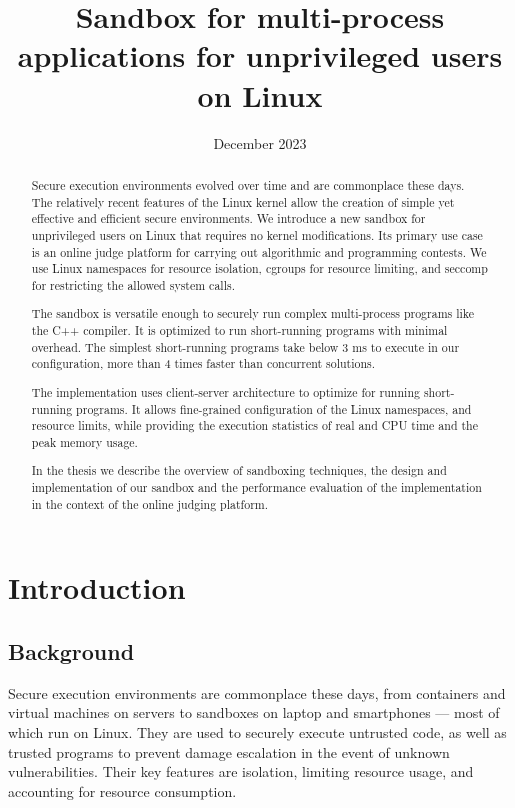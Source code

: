 \documentclass[en]{pracamgr}
\title{Sandbox for multi-process applications for unprivileged users on Linux}
\date{December 2023}
\begin{document}
\renewcommand\textfraction{0}

\maketitle

\begin{abstract}
Secure execution environments evolved over time and are commonplace these days. The relatively recent features of the Linux kernel allow the creation of simple yet effective and efficient secure environments. We introduce a new sandbox for unprivileged users on Linux that requires no kernel modifications. Its primary use case is an online judge platform for carrying out algorithmic and programming contests. We use Linux namespaces for resource isolation, cgroups for resource limiting, and seccomp for restricting the allowed system calls.

The sandbox is versatile enough to securely run complex multi-process programs like the C++ compiler. It is optimized to run short-running programs with minimal overhead. The simplest short-running programs take below 3 ms to execute in our configuration, more than 4 times faster than concurrent solutions.

The implementation uses client-server architecture to optimize for running short-running programs. It allows fine-grained configuration of the Linux namespaces, and resource limits, while providing the execution statistics of real and CPU time and the peak memory usage.

In the thesis we describe the overview of sandboxing techniques, the design and implementation of our sandbox and the performance evaluation of the implementation in the context of the online judging platform.

\end{abstract}

\tableofcontents

\chapter{Introduction}\label{chapter:introduction}

\section{Background}

Secure execution environments are commonplace these days, from containers and virtual machines on servers to sandboxes on laptop and smartphones --- most of which run on Linux. They are used to securely execute untrusted code, as well as trusted programs to prevent damage escalation in the event of unknown vulnerabilities. Their key features are isolation, limiting resource usage, and accounting for resource consumption.
\end{document}
